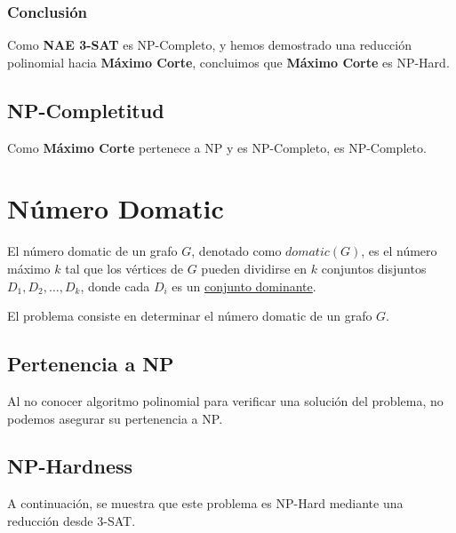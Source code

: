 \documentclass[a4paper,12pt]{article}
\begin{document}
\subsubsection{Conclusi\'on}
Como \textbf{NAE 3-SAT} es NP-Completo, y hemos demostrado una reducci\'on polinomial hacia \textbf{Máximo Corte}, concluimos que \textbf{Máximo Corte} es NP-Hard. 

\subsection{NP-Completitud}

Como \textbf{Máximo Corte} pertenece a NP y es NP-Completo, es NP-Completo.



\section{Número Domatic}

El número domatic de un grafo $G$, denotado como $domatic(G)$, es el número máximo $k$ tal que los vértices de $G$ pueden dividirse en $k$ conjuntos disjuntos $D_1, D_2, \dots, D_k$, donde cada $D_i$ es un \hyperref[sec:domatic]{conjunto dominante}.


El problema consiste en determinar el número domatic de un grafo $G$. 

\subsection{Pertenencia a NP}

Al no conocer algoritmo polinomial para verificar una solución del problema, no podemos asegurar su pertenencia a NP.

\subsection{NP-Hardness}

A continuación, se muestra que este problema es NP-Hard mediante una reducción desde \textsc{3-SAT}.
\end{document}
